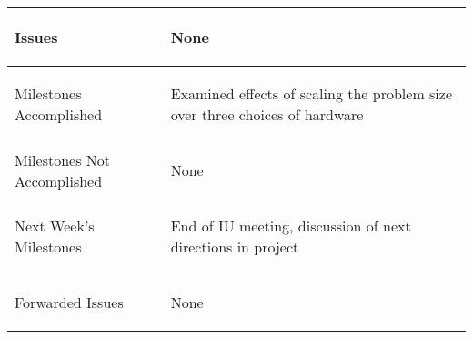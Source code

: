 \documentclass[11pt,letterpaper]{article}
\begin{document}
\begin{tabular}{| p{} | p{} |}
	Issues & \begin{enumerate*}
	\item[\tiny\textbullet] None
	\end{enumerate*} \\ \hline

	Milestones \newline Accomplished & \begin{enumerate*}
	\item[\tiny\textbullet] Examined effects of scaling the problem size over three choices of hardware
    \end{enumerate*} \\ \hline

	Milestones Not \newline Accomplished & \begin{enumerate*}
	\item[\tiny\textbullet] None
	\end{enumerate*} \\ \hline

	Next Week's \newline Milestones & \begin{enumerate*}
    \item[\tiny\textbullet] End of IU meeting, discussion of next directions in project
	\end{enumerate*} \\ \hline

	Forwarded Issues & \begin{enumerate*}
	\item[\tiny\textbullet] None
	\end{enumerate*} \\ \hline
\end{tabular}

\vspace{.25in}
\end{document}
